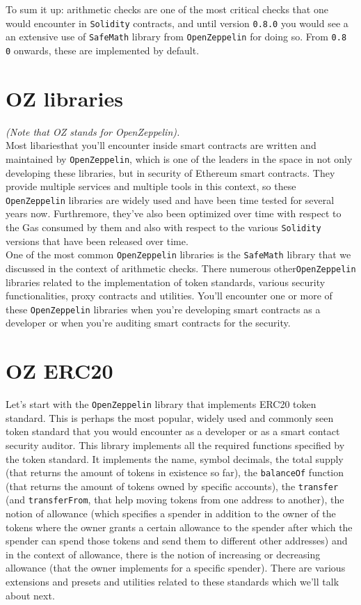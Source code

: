 To sum it up: arithmetic checks are one of the most critical checks that one would encounter in \verb|Solidity| contracts, and until version \verb|0.8.0| you would see a an extensive use of \verb|SafeMath| library from \verb|OpenZeppelin| for doing so. From \verb|0.8 0| onwards, these are implemented by default.

\section{OZ libraries}
\textit{(Note that OZ stands for OpenZeppelin).}\\

Most libariesthat you'll encounter inside smart contracts are written and maintained by \verb|OpenZeppelin|, which is one of the leaders in the space in not only developing these libraries, but in security of Ethereum smart contracts. They provide multiple services and multiple tools in this context, so these \verb|OpenZeppelin| libraries are widely used and have been time tested for several years now. Furthremore, they've also been optimized over time with respect to the Gas consumed by them and also with respect to the various \verb|Solidity| versions that have been released over time.\\

One of the most common \verb|OpenZeppelin| libraries is the \verb|SafeMath| library that we discussed in the context of arithmetic checks. There numerous other\linebreak\verb|OpenZeppelin| libraries related to the implementation of token standards, various security functionalities, proxy contracts and utilities. You'll encounter one or more of these \verb|OpenZeppelin| libraries when you're developing smart contracts as a developer or when you're auditing smart contracts for the security.

\section{OZ ERC20}

Let's start with the \verb|OpenZeppelin| library that implements ERC20 token standard. This is perhaps the most popular, widely used and commonly seen token standard that you would encounter as a developer or as a smart contact security auditor. This library implements all the required functions specified by the token standard. It implements the name, symbol decimals, the total supply (that returns the amount of tokens in existence so far), the \verb|balanceOf| function (that returns the amount of tokens owned by specific accounts), the \verb|transfer| (and \verb|transferFrom|, that help moving tokens from one address to another), the notion of allowance (which specifies a spender in addition to the owner of the tokens where the owner grants a certain allowance to the spender after which the spender can spend those tokens and send them to different other addresses) and in the context of allowance, there is the notion of increasing or decreasing allowance (that the owner implements for a specific spender). There are various extensions and presets and utilities related to these standards which we'll talk about next.

